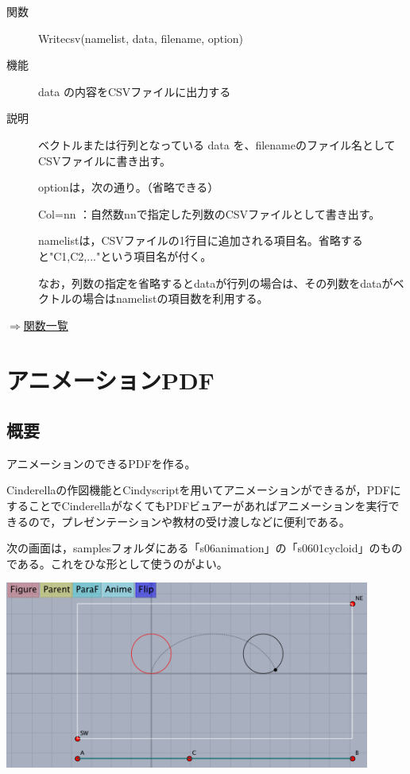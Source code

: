 \documentclass[papersize,a4paper,12pt,uplatex]{jsarticle}
\begin{document}
\begin{description}
\vspace{\baselineskip}
\hypertarget{writecsv}{}
\item[関数]  Writecsv(namelist, data, filename, option)
\item[機能]  data の内容をCSVファイルに出力する
\item[説明]  ベクトルまたは行列となっている data を、filenameのファイル名としてCSVファイルに書き出す。

optionは，次の通り。（省略できる）

Col=nn  ：自然数nnで指定した列数のCSVファイルとして書き出す。
 
namelistは，CSVファイルの1行目に追加される項目名。省略すると"C1,C2,..."という項目名が付く。

 
なお，列数の指定を省略するとdataが行列の場合は、その列数をdataがベクトルの場合はnamelistの項目数を利用する。

\end{description}

\begin{flushright}  \hyperlink{functionlist}{$\Rightarrow$関数一覧}\end{flushright}

\newpage


\section{アニメーションPDF}
\subsection{概要}
アニメーションのできるPDFを作る。

Cinderellaの作図機能とCindyscriptを用いてアニメーションができるが，PDFにすることでCinderellaがなくてもPDFビュアーがあればアニメーションを実行できるので，プレゼンテーションや教材の受け渡しなどに便利である。

次の画面は，samplesフォルダにある「s06animation」の「s0601cycloid」のものである。これをひな形として使うのがよい。

\vspace{\baselineskip}
    \includegraphics[bb=0 0 732.04 376.02 , width=12cm]{Fig/mvgaiyou01.pdf}
\end{document}
